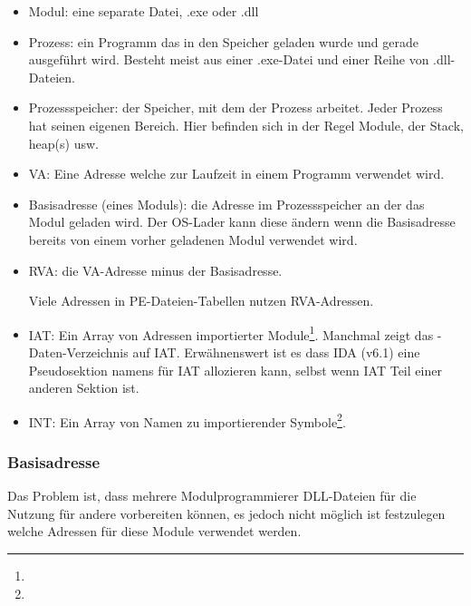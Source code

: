 \begin{itemize}
\item Modul: eine separate Datei, .exe oder .dll

\item Prozess: ein Programm das in den Speicher geladen wurde und gerade ausgeführt
wird. Besteht meist aus einer .exe-Datei und einer Reihe von .dll-Dateien.

\item Prozessspeicher: der Speicher, mit dem der Prozess arbeitet. Jeder Prozess
hat seinen eigenen Bereich. Hier befinden sich in der Regel Module, der Stack,
\gls{heap}(s) usw.

\item \ac{VA}: Eine Adresse welche zur Laufzeit in einem Programm verwendet wird.

\item Basisadresse (eines Moduls): die Adresse im Prozessspeicher an der das Modul
geladen wird. Der \ac{OS}-Lader kann diese ändern wenn die Basisadresse bereits
von einem vorher geladenen Modul verwendet wird.

\item \ac{RVA}: die \ac{VA}-Adresse minus der Basisadresse.

Viele Adressen in PE-Dateien-Tabellen nutzen \ac{RVA}-Adressen.


\item \ac{IAT}: Ein Array von Adressen importierter Module\footnote{\PietrekPE}. 
Manchmal zeigt das -Daten-Verzeichnis auf \ac{IAT}.
\label{IDA_idata}
Erwähnenswert ist es dass \ac{IDA} (v6.1) eine Pseudosektion namens 
für \ac{IAT} allozieren kann, selbst wenn \ac{IAT} Teil einer anderen Sektion ist.

\item \ac{INT}: Ein Array von Namen zu importierender Symbole\footnote{\PietrekPE}.
\end{itemize}

\subsubsection{Basisadresse}

Das Problem ist, dass mehrere Modulprogrammierer DLL-Dateien für die Nutzung für andere
vorbereiten können, es jedoch nicht möglich ist festzulegen welche Adressen für diese
Module verwendet werden.

